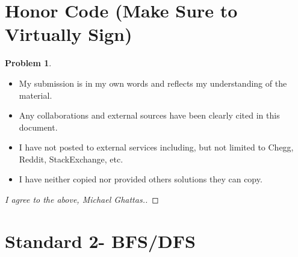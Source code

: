 \documentclass[11pt]{article}
\theoremstyle{definition}
\theoremstyle{definition}
\newtheorem{required}{Problem}
\theoremstyle{definition}
\begin{document}
\section{Honor Code (Make Sure to Virtually Sign)} \label{HonorCode}

\begin{required}
\begin{itemize}
\item My submission is in my own words and reflects my understanding of the material.
\item Any collaborations and external sources have been clearly cited in this document.
\item I have not posted to external services including, but not limited to Chegg, Reddit, StackExchange, etc.
\item I have neither copied nor provided others solutions they can copy.
\end{itemize}

\end{required}

\begin{proof}[I agree to the above, Michael Ghattas.]
\end{proof}


\newpage
\section{Standard 2- BFS/DFS}
\end{document}
